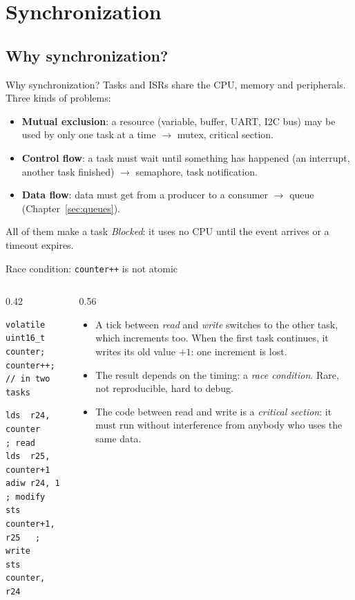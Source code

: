 \section{Synchronization}
\label{sec:sync}

\subsection{Why synchronization?}
\begin{frame}{Why synchronization?}
  Tasks and ISRs share the CPU, memory and peripherals. Three kinds of problems:
  \begin{itemize}
    \item \textbf{Mutual exclusion}: a resource (variable, buffer, UART, I2C bus) may be used by only one task at a time $\rightarrow$ mutex, critical section.
    \item \textbf{Control flow}: a task must wait until something has happened (an interrupt, another task finished) $\rightarrow$ semaphore, task notification.
    \item \textbf{Data flow}: data must get from a producer to a consumer $\rightarrow$ queue (Chapter~\ref{sec:queues}).
  \end{itemize}
  All of them make a task \emph{Blocked}: it uses no CPU until the event arrives or a timeout expires.
\end{frame}

\begin{frame}[fragile]{Race condition: \texttt{counter++} is not atomic}
  \begin{columns}[T]
    \begin{column}{0.42\textwidth}
\begin{lstlisting}
volatile uint16_t counter;
counter++;   // in two tasks
\end{lstlisting}
\begin{lstlisting}[language={},numbers=none]
lds  r24, counter     ; read
lds  r25, counter+1
adiw r24, 1           ; modify
sts  counter+1, r25   ; write
sts  counter, r24
\end{lstlisting}
    \end{column}
    \begin{column}{0.56\textwidth}
      \small
      \begin{itemize}
        \item A tick between \emph{read} and \emph{write} switches to the other task, which increments too. When the first task continues, it writes its old value $+1$: one increment is lost.
        \item The result depends on the timing: a \emph{race condition}. Rare, not reproducible, hard to debug.
        \item The code between read and write is a \emph{critical section}: it must run without interference from anybody who uses the same data.
      \end{itemize}
    \end{column}
  \end{columns}
\end{frame}

